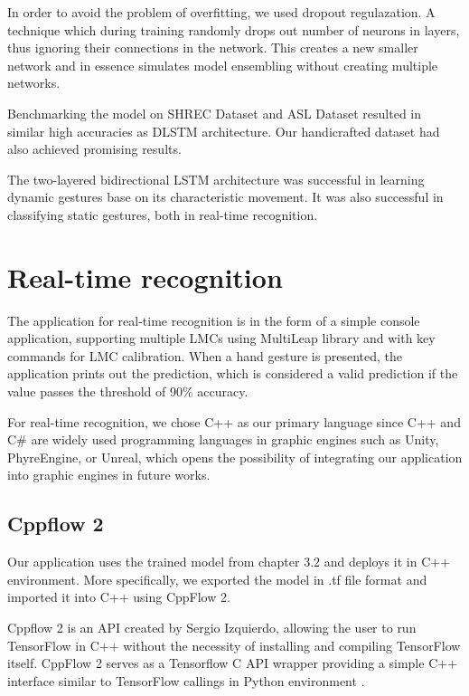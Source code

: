 In order to avoid the problem of overfitting, we used dropout regulazation. 
A technique which during training randomly drops out number of neurons in layers, thus ignoring their connections in the network. This creates a new smaller network and in essence simulates model ensembling without creating multiple networks.



Benchmarking the model on SHREC Dataset and ASL Dataset resulted in similar high accuracies as DLSTM architecture. Our handicrafted dataset had also achieved promising results.

The two-layered bidirectional LSTM architecture was successful in learning dynamic gestures base on its characteristic movement. It was also successful in classifying static gestures, both in real-time recognition.

\section{Real-time recognition}

The application for real-time recognition is in the form of a simple console application, supporting multiple LMCs using MultiLeap library and with key commands for LMC calibration. When a hand gesture is presented, the application prints out the prediction, which is considered a valid prediction if the value passes the threshold of 90\% accuracy.  

For real-time recognition, we chose C++ as our primary language since C++ and C\# are widely used programming languages in graphic engines such as Unity, PhyreEngine, or Unreal, which opens the possibility of integrating our application into graphic engines in future works.

\subsection{Cppflow 2}

Our application uses the trained model from chapter 3.2 and deploys it in C++ environment. More specifically, we exported the model in .tf file format and imported it into C++ using CppFlow 2.

Cppflow 2 is an API created by Sergio Izquierdo, allowing the user to run TensorFlow in C++ without the necessity of installing and compiling TensorFlow itself. CppFlow 2 serves as a Tensorflow C API wrapper providing a simple C++ interface similar to TensorFlow callings in Python environment \cite{cppflow}. 

